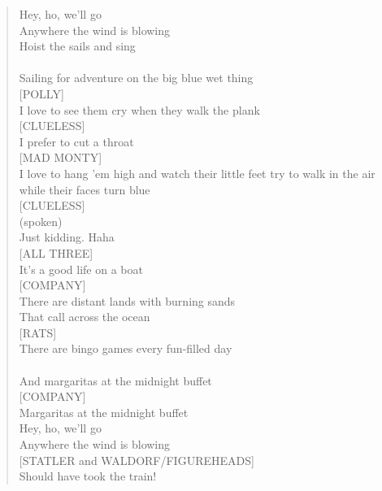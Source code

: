 \documentclass[11pt]{article}
\begin{document}
\begin{verse}
\vspace*{1em}
Hey, ho, we'll go\\
Anywhere the wind is blowing\\
Hoist the sails and sing\\
[FOZZIE/SQUIRE TRELAWNEY]\\
Sailing for adventure on the big blue wet thing\\
\vspace*{1em}
[POLLY]\\
I love to see them cry when they walk the plank\\
\vspace*{1em}
[CLUELESS]\\
I prefer to cut a throat\\
\vspace*{1em}
[MAD MONTY]\\
I love to hang 'em high and watch their little feet try to walk in the air while their faces turn blue\\
\vspace*{1em}
[CLUELESS]\\
(spoken)\\
Just kidding. Haha\\
\vspace*{1em}
[ALL THREE]\\
It's a good life on a boat\\
\vspace*{1em}
[COMPANY]\\
There are distant lands with burning sands\\
That call across the ocean\\
\vspace*{1em}
[RATS]\\
There are bingo games every fun-filled day\\
[FEMALE RAT]\\
And margaritas at the midnight buffet\\
\vspace*{1em}
[COMPANY]\\
Margaritas at the midnight buffet\\
\vspace*{1em}
Hey, ho, we'll go\\
Anywhere the wind is blowing\\
\vspace*{1em}
[STATLER and WALDORF/FIGUREHEADS]\\
Should have took the train!\\
\vspace*{1em}

\end{verse}
\end{document}
